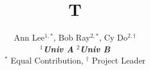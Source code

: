 \documentclass{article}
\begin{document}
\title{T}
\author{Ann Lee$^{1,*}$, Bob Ray$^{2,*}$, Cy Do$^{2,\dagger}$\\
\textbf{\textit{$^1$Univ A}}  \textbf{\textit{$^2$Univ B}}\\
$^*$ Equal Contribution, $^\dagger$ Project Leader}
\maketitle
\end{document}
